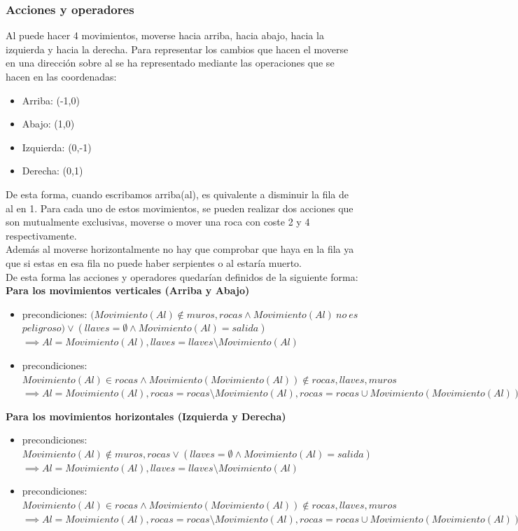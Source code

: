 \documentclass[11pt,spanish]{article}
\begin{document}
			\subsubsection{Acciones y operadores}
			Al puede hacer 4 movimientos, moverse hacia arriba, hacia abajo, hacia la izquierda y hacia la derecha. Para representar los cambios que hacen el moverse en una dirección sobre al se ha representado mediante las operaciones que se hacen en las coordenadas:
			\begin{itemize}
				\item Arriba: (-1,0)
				\item Abajo: (1,0)
				\item Izquierda: (0,-1)
				\item Derecha: (0,1)
			\end{itemize}
			De esta forma, cuando escribamos arriba(al), es quivalente a disminuir la fila de al en 1.
			Para cada uno de estos movimientos, se pueden realizar dos acciones que son mutualmente exclusivas, moverse o mover una roca con coste 2 y 4 respectivamente.\\
			Además al moverse horizontalmente no hay que comprobar que haya en la fila ya que si estas en esa fila no puede haber serpientes o al estaría muerto.\\
			De esta forma las acciones y operadores quedarían definidos de la siguiente forma:\\
			\textbf{Para los movimientos verticales (Arriba y Abajo)}
			\begin{itemize}
				\item precondiciones: $(Movimiento(Al) \notin muros, rocas \land Movimiento(Al)\ no\ es$\\$peligroso) \lor (llaves = \emptyset \land Movimiento(Al) = salida)$\\
				$\implies Al = Movimiento(Al), llaves = llaves\setminus Movimiento(Al)$
				\item precondiciones: $Movimiento(Al) \in rocas \land Movimiento(Movimiento(Al)) \notin rocas, llaves, muros$\\
				$\implies Al = Movimiento(Al), rocas = rocas\setminus Movimiento(Al), rocas = rocas \cup Movimiento(Movimiento(Al))$
			\end{itemize}
			\textbf{Para los movimientos horizontales (Izquierda y Derecha)}
			\begin{itemize}
				\item precondiciones: $Movimiento(Al) \notin muros, rocas \lor (llaves = \emptyset \land Movimiento(Al) = salida)$\\
				$\implies Al = Movimiento(Al), llaves = llaves\setminus Movimiento(Al)$
				\item precondiciones: $Movimiento(Al) \in rocas \land Movimiento(Movimiento(Al)) \notin rocas, llaves, muros$\\
				$\implies Al = Movimiento(Al), rocas = rocas\setminus Movimiento(Al), rocas = rocas \cup Movimiento(Movimiento(Al))$
			\end{itemize}
\end{document}
